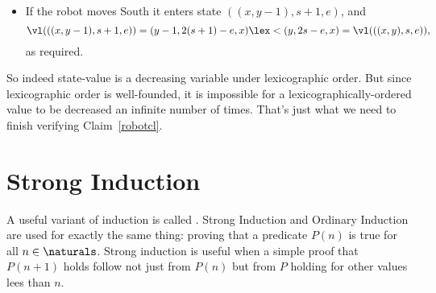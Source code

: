 \begin{editingnotes}
\begin{itemize}
\item If the robot moves South it enters state $((x,y-1),s+1,e)$, and
\[
\vl(((x,y-1),s+1,e)) = (y-1,2(s+1)-e,x) \lex< (y,2s-e,x) = \vl(((x,y),s,e)),
\]
as required.

\end{itemize}

So indeed state-value is a decreasing variable under lexicographic order.
But since lexicographic order is well-founded, it is impossible for a
lexicographically-ordered value to be decreased an infinite number of
times.  That's just what we need to finish verifying Claim~\ref{robotcl}.
\fi

\end{editingnotes}


\begin{problems}
\homeworkproblems








\classproblems








\end{problems}


\section{Strong Induction}\label{strong_ind_sec}

A useful variant of induction is called .
Strong Induction and Ordinary Induction are used for exactly the same
thing: proving that a predicate $P(n)$ is true for all $n \in
\naturals$.  Strong induction is useful when a simple proof that
$P(n+1)$ holds follow not just from $P(n)$ but from $P$ holding for
other values lees than $n$.

